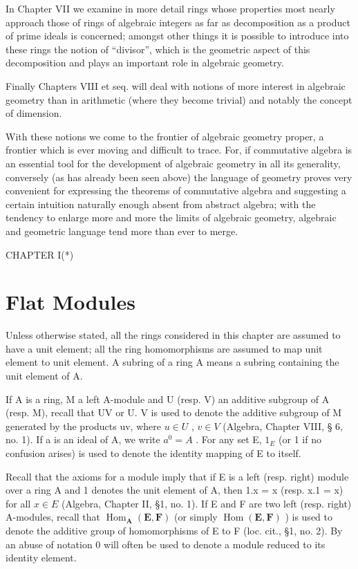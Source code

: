 In Chapter VII we examine in more detail rings whose properties most nearly approach those of rings of algebraic integers as far as decomposition as a product of prime ideals is concerned; amongst other things it is possible to introduce into these rings the notion of ``divisor'', which is the geometric aspect of this decomposition and plays an important role in algebraic geometry.

Finally Chapters VIII et seq. will deal with notions of more interest in algebraic geometry than in arithmetic (where they become trivial) and notably the concept of dimension.

With these notions we come to the frontier of algebraic geometry proper, a frontier which is ever moving and difficult to trace. For, if commutative algebra is an essential tool for the development of algebraic geometry in all its generality, conversely (as has already been seen above) the language of geometry proves very convenient for expressing the theorems of commutative algebra and suggesting a certain intuition naturally enough absent from abstract algebra; with the tendency to enlarge more and more the limits of algebraic geometry, algebraic and geometric language tend more than ever to merge.

CHAPTER I(*)

\chapter{Flat Modules}

Unless otherwise stated, all the rings considered in this chapter are assumed to have a unit element; all the ring homomorphisms are assumed to map unit element to unit element. A subring of a ring A means a subring containing the unit element of A.

If A is a ring, M a left A-module and U (resp. V) an additive subgroup of A (resp. M), recall that UV or U. V is used to denote the additive subgroup of M generated by the products uv, where \(u \in U\) , \(v \in V\) (Algebra, Chapter VIII, § 6, no. 1). If a is an ideal of A, we write \(a^{0} = A\) . For any set E, \(1_{E}\) (or 1 if no confusion arises) is used to denote the identity mapping of E to itself.

Recall that the axioms for a module imply that if E is a left (resp. right) module over a ring A and 1 denotes the unit element of A, then 1.x = x (resp. x.1 = x) for all \(x \in E\) (Algebra, Chapter II, §1, no. 1). If E and F are two left (resp. right) A-modules, recall that \(\operatorname{Hom}_{\mathbf{A}}(\mathbf{E}, \mathbf{F})\) (or simply \(\operatorname{Hom}(\mathbf{E}, \mathbf{F})\) ) is used to denote the additive group of homomorphisms of E to F (loc. cit., §1, no. 2). By an abuse of notation 0 will often be used to denote a module reduced to its identity element.

